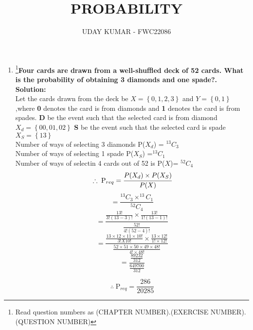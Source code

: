 \documentclass{article}
\providecommand{\cbrak}[1]{\ensuremath{\left\{#1\right\}}}
\newcommand{\solution}{\noindent \textbf{Solution: }}
\begin{document}
\title{PROBABILITY}
\author{\Large UDAY KUMAR - FWC22086}
\date{}

\maketitle

\begin{enumerate}[label=16.\arabic{enumi}.\arabic{enumii}]%
\setcounter{enumi}{3}
\setcounter{enumii}{6}

\item \footnote{Read question numbers as (CHAPTER NUMBER).(EXERCISE NUMBER).(QUESTION NUMBER)}\textbf {Four cards are drawn from a well-shuffled deck of 52 cards. What is the probability of obtaining 3 diamonds and one spade?.}\\[1ex]
	\solution\\
		Let the cards drawn from the deck be $X = \cbrak{0,1,2,3}$ and $Y = \cbrak{0,1}$,where \textbf 0 denotes the card is from diamonds and \textbf 1 denotes the card is from spades.
		\textbf D be the event such that the selected card is from diamond $X_d
 = \cbrak{00,01,02}$
 \textbf S be the event such that the selected card is spade $X_S = \cbrak{ 13 }$\\
 Number of ways of selecting 3 diamonds  P($X_d$)   = $^{13}C_3$\\
 Number of ways of selecting 1 spade  P($X_S$) =$^{13}C_1$\\
 Number of ways of selectin 4 cards out of 52 is  P($X$)= $^{52}C_4$\\
		
		
	 \begin{equation}
	  \therefore \; \text{P}_{req} = \cfrac{P(X_d) \times P(X_S)}{P(X)} 
  \end{equation}
  \begin{equation}
 = \dfrac{^{13}C_3 \times ^{13}C_1}{^{52}C_4}
\end{equation}
\begin{equation}
= \dfrac{\frac{13!}{3!(13-3)!} \times \frac{13!}{1!(13-1)!}}{\frac{52!}{4!(52-4)!}}
\end{equation}
\begin{equation}
= \dfrac{\frac{13\times12\times11\times10!}{3!X10!}\times\frac{13\times12!}{1!\times12!}}{\frac{52\times51\times50\times49\times48!}{4!\times48!}}
\end{equation}
\begin{equation}
= \dfrac{\frac{89232}{312}}{\frac{649700}{312}}
\end{equation}

\begin{equation}
\therefore \; \boxed{\text{P}_{req} = \frac{286}{20285}}
\end{equation}
		
	
		
    

\end{enumerate}
\end{document}
